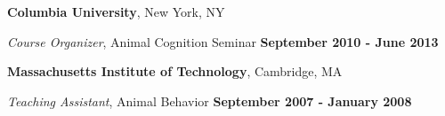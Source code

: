 \documentclass[margin,line]{res}
\newenvironment{list2}{
  \begin{list}{$\bullet$}{%
      \setlength{\itemsep}{0in}
      \setlength{\parsep}{0in} \setlength{\parskip}{0in}
      \setlength{\topsep}{0in} \setlength{\partopsep}{0in} 
      \setlength{\leftmargin}{0.2in}}}{\end{list}}
\begin{document}
\begin{resume}
{\bf Columbia University}, New York, NY

\vspace{-.2cm}
{\em Course Organizer}, Animal Cognition Seminar \hfill {\bf September 2010 - June 2013}\\
\vspace{-.5cm}


{\bf Massachusetts Institute of Technology}, Cambridge, MA

\vspace{-.2cm}
{\em Teaching Assistant}, Animal Behavior \hfill {\bf September 2007 - January 2008}\\
\vspace{-.5cm}




\vspace{.3cm}

%






\end{resume}
\end{document}
